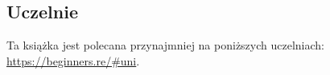 \subsection*{Uczelnie}

Ta książka jest polecana przynajmniej na poniższych uczelniach:
\url{https://beginners.re/\#uni}.

